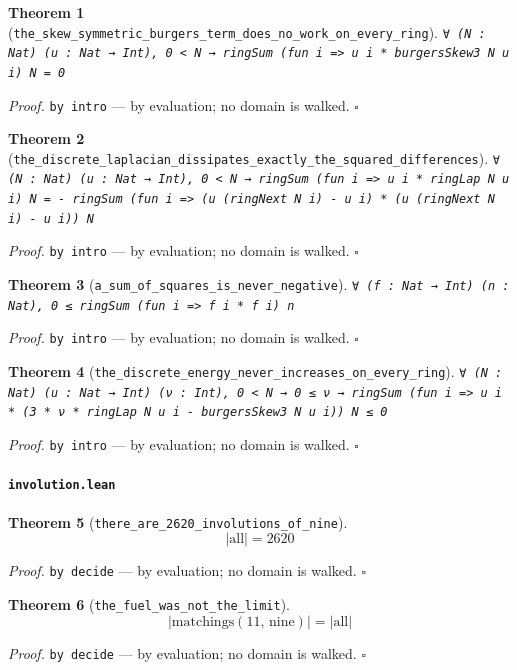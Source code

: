 \documentclass[11pt]{article}
\newtheorem{theorem}{Theorem}[section]
\begin{document}
\begin{theorem}[\texttt{the\_skew\_symmetric\_burgers\_term\_does\_no\_work\_on\_every\_ring}]
\texttt{∀ (N : Nat) (u : Nat → Int), 0 < N → ringSum (fun i => u i * burgersSkew3 N u i) N = 0}
\end{theorem}
\noindent\emph{Proof.} \texttt{by
  intro} --- by evaluation; no domain is walked. \hfill$\square$

\begin{theorem}[\texttt{the\_discrete\_laplacian\_dissipates\_exactly\_the\_squared\_differences}]
\texttt{∀ (N : Nat) (u : Nat → Int), 0 < N → ringSum (fun i => u i * ringLap N u i) N = - ringSum (fun i => (u (ringNext N i) - u i) * (u (ringNext N i) - u i)) N}
\end{theorem}
\noindent\emph{Proof.} \texttt{by
  intro} --- by evaluation; no domain is walked. \hfill$\square$

\begin{theorem}[\texttt{a\_sum\_of\_squares\_is\_never\_negative}]
\texttt{∀ (f : Nat → Int) (n : Nat), 0 ≤ ringSum (fun i => f i * f i) n}
\end{theorem}
\noindent\emph{Proof.} \texttt{by
  intro} --- by evaluation; no domain is walked. \hfill$\square$

\begin{theorem}[\texttt{the\_discrete\_energy\_never\_increases\_on\_every\_ring}]
\texttt{∀ (N : Nat) (u : Nat → Int) (ν : Int), 0 < N → 0 ≤ ν → ringSum (fun i => u i * (3 * ν * ringLap N u i - burgersSkew3 N u i)) N ≤ 0}
\end{theorem}
\noindent\emph{Proof.} \texttt{by
  intro} --- by evaluation; no domain is walked. \hfill$\square$

\paragraph{\texttt{involution.lean}}

\begin{theorem}[\texttt{there\_are\_2620\_involutions\_of\_nine}]
\[ \left|\mathrm{all}\right| = 2620 \]
\end{theorem}
\noindent\emph{Proof.} \texttt{by decide} --- by evaluation; no domain is walked. \hfill$\square$

\begin{theorem}[\texttt{the\_fuel\_was\_not\_the\_limit}]
\[ \left|\mathrm{matchings}\mathopen{}\left(11,\,\mathrm{nine}\right)\right| = \left|\mathrm{all}\right| \]
\end{theorem}
\noindent\emph{Proof.} \texttt{by decide} --- by evaluation; no domain is walked. \hfill$\square$
\end{document}
